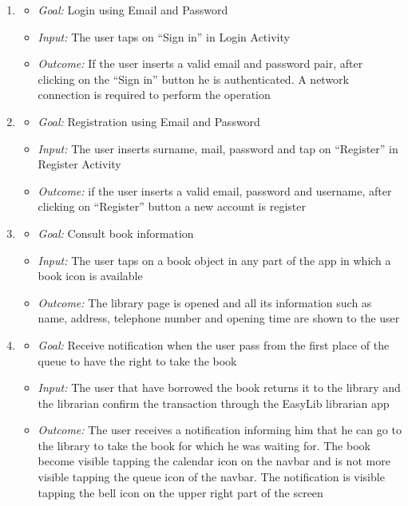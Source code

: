 \begin{enumerate}
	\item 
	\begin{itemize}
		\item \emph{Goal: }Login using Email and Password
		\item \emph{Input: }The user taps on “Sign in” in Login Activity
		\item \emph{Outcome: }If the user inserts a valid email and password
		pair, after clicking on the “Sign in” button he is
		authenticated. A network connection is required to
		perform the operation
		
	\end{itemize}

\item 
\begin{itemize}
	\item \emph{Goal: }Registration using Email and Password
	\item \emph{Input: }The user inserts surname, mail, password and tap on “Register” in Register Activity
	\item \emph{Outcome: }if the user inserts a valid email, password and username, after clicking on “Register” button a new
	account is register
\end{itemize}

\item 
\begin{itemize}
	\item \emph{Goal: }Consult book information
	\item \emph{Input: }The user taps on a book object in any part of the app in which a book icon is available
	\item \emph{Outcome: }The library page is opened and all its information such as name, address, telephone number and opening time are shown to the user
	
	
\end{itemize}

\item 
\begin{itemize}
	\item \emph{Goal: }Receive notification when the user pass from the first place of the queue to have the right to take the book
	\item \emph{Input: }The user that have borrowed the book returns it to the library and the librarian confirm the transaction through the EasyLib librarian app
	\item \emph{Outcome: }The user receives a notification informing him that he can go to the library to take the book for which he was waiting for. The book become visible tapping the calendar icon on the navbar and is not more visible tapping the queue icon of the navbar. The notification is visible tapping the bell icon on the upper right part of the screen
\end{itemize}


\end{enumerate}
